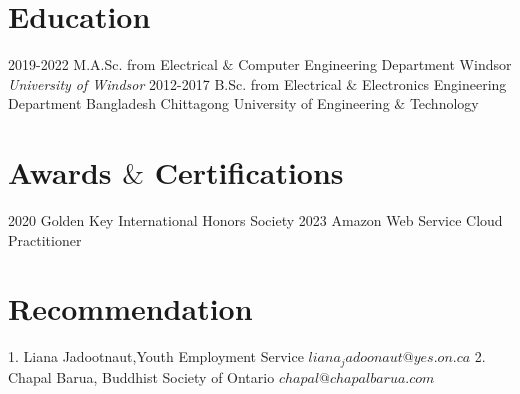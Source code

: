 \documentclass[]{twentysecondcv}
\begin{document}
\section{Education}
\begin{twenty}
  \twentyitem
    {2019-2022}
    {M.A.Sc. {\normalfont from Electrical $\&$ Computer Engineering Department}}
    {Windsor}
    {\emph{University of Windsor}}
  \twentyitem
    {2012-2017}
    {B.Sc. from Electrical $\&$ Electronics Engineering Department}
    {Bangladesh}
    {Chittagong University of Engineering $\&$ Technology}
\end{twenty}

\section{Awards $\&$ Certifications}
\begin{twentyshort}
   \twentyitemshort
    {2020}
    {Golden Key International Honors Society}
  \twentyitemshort
    {2023}
    {Amazon Web Service Cloud Practitioner}
\end{twentyshort}


\section{Recommendation}
\begin{twenty}
  \twentyitem
    {1.}
    {Liana Jadootnaut,Youth Employment Service}
    {}
    {\href{mailto:liana_jadoonaut@yes.on.ca}{$liana_jadoonaut@yes.on.ca$}}
  \twentyitem
    {2.}
    {Chapal Barua, Buddhist Society of Ontario}
    {}
    {\href{mailto:chapal@chapalbarua.com}{$chapal@chapalbarua.com$}}
\end{twenty}

\end{document}
